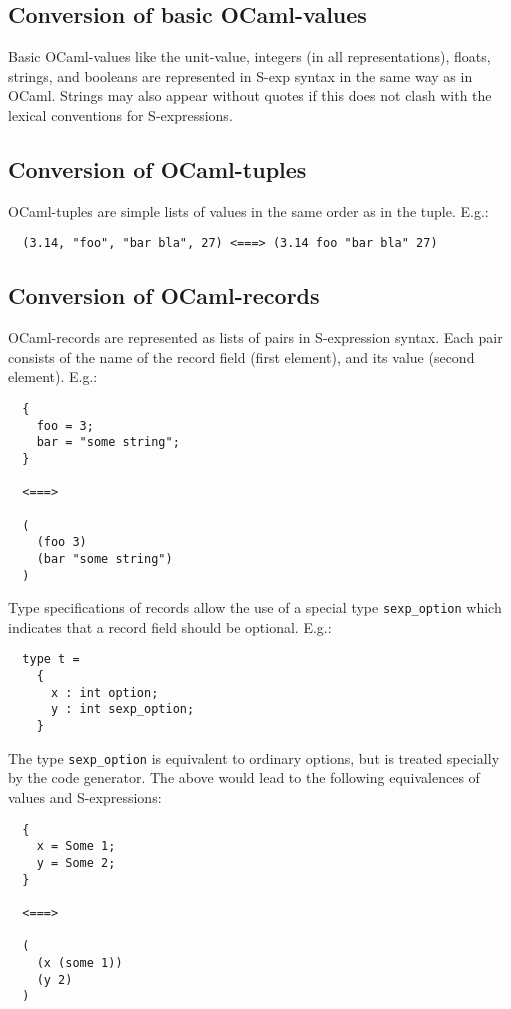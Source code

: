 \documentclass[a4paper]{article}
\begin{document}
\subsection{Conversion of basic OCaml-values}

Basic OCaml-values like the unit-value, integers (in all representations),
floats, strings, and booleans are represented in S-exp syntax in the
same way as in OCaml.  Strings may also appear without quotes if this
does not clash with the lexical conventions for S-expressions.

\subsection{Conversion of OCaml-tuples}

OCaml-tuples are simple lists of values in the same order as in the tuple.
E.g.:

\begin{verbatim}
  (3.14, "foo", "bar bla", 27) <===> (3.14 foo "bar bla" 27)
\end{verbatim}

\subsection{Conversion of OCaml-records}

OCaml-records are represented as lists of pairs in S-expression syntax.
Each pair consists of the name of the record field (first element),
and its value (second element).  E.g.:

\begin{verbatim}
  {
    foo = 3;
    bar = "some string";
  }

  <===>

  (
    (foo 3)
    (bar "some string")
  )
\end{verbatim}

Type specifications of records allow the use of a special type
\verb=sexp_option= which indicates that a record field should be optional.
E.g.:

\begin{verbatim}
  type t =
    {
      x : int option;
      y : int sexp_option;
    }
\end{verbatim}

The type \verb=sexp_option= is equivalent to ordinary options, but is
treated specially by the code generator.  The above would lead to the
following equivalences of values and S-expressions:
\newpage
\begin{verbatim}
  {
    x = Some 1;
    y = Some 2;
  }

  <===>

  (
    (x (some 1))
    (y 2)
  )
\end{verbatim}
\end{document}
